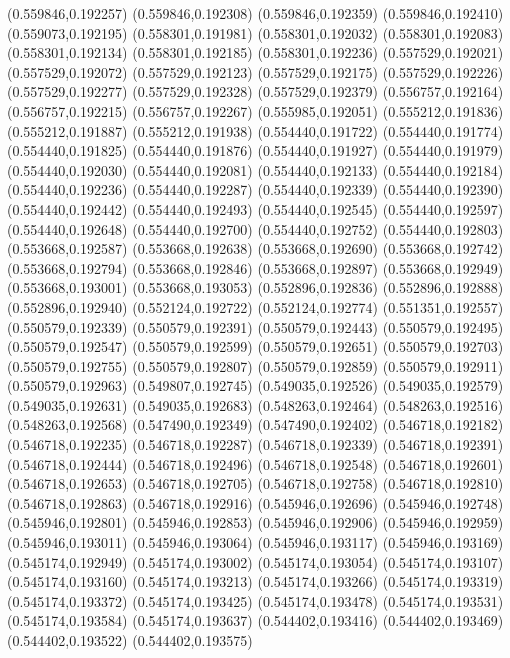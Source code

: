 (0.559846,0.192257)
(0.559846,0.192308)
(0.559846,0.192359)
(0.559846,0.192410)
(0.559073,0.192195)
(0.558301,0.191981)
(0.558301,0.192032)
(0.558301,0.192083)
(0.558301,0.192134)
(0.558301,0.192185)
(0.558301,0.192236)
(0.557529,0.192021)
(0.557529,0.192072)
(0.557529,0.192123)
(0.557529,0.192175)
(0.557529,0.192226)
(0.557529,0.192277)
(0.557529,0.192328)
(0.557529,0.192379)
(0.556757,0.192164)
(0.556757,0.192215)
(0.556757,0.192267)
(0.555985,0.192051)
(0.555212,0.191836)
(0.555212,0.191887)
(0.555212,0.191938)
(0.554440,0.191722)
(0.554440,0.191774)
(0.554440,0.191825)
(0.554440,0.191876)
(0.554440,0.191927)
(0.554440,0.191979)
(0.554440,0.192030)
(0.554440,0.192081)
(0.554440,0.192133)
(0.554440,0.192184)
(0.554440,0.192236)
(0.554440,0.192287)
(0.554440,0.192339)
(0.554440,0.192390)
(0.554440,0.192442)
(0.554440,0.192493)
(0.554440,0.192545)
(0.554440,0.192597)
(0.554440,0.192648)
(0.554440,0.192700)
(0.554440,0.192752)
(0.554440,0.192803)
(0.553668,0.192587)
(0.553668,0.192638)
(0.553668,0.192690)
(0.553668,0.192742)
(0.553668,0.192794)
(0.553668,0.192846)
(0.553668,0.192897)
(0.553668,0.192949)
(0.553668,0.193001)
(0.553668,0.193053)
(0.552896,0.192836)
(0.552896,0.192888)
(0.552896,0.192940)
(0.552124,0.192722)
(0.552124,0.192774)
(0.551351,0.192557)
(0.550579,0.192339)
(0.550579,0.192391)
(0.550579,0.192443)
(0.550579,0.192495)
(0.550579,0.192547)
(0.550579,0.192599)
(0.550579,0.192651)
(0.550579,0.192703)
(0.550579,0.192755)
(0.550579,0.192807)
(0.550579,0.192859)
(0.550579,0.192911)
(0.550579,0.192963)
(0.549807,0.192745)
(0.549035,0.192526)
(0.549035,0.192579)
(0.549035,0.192631)
(0.549035,0.192683)
(0.548263,0.192464)
(0.548263,0.192516)
(0.548263,0.192568)
(0.547490,0.192349)
(0.547490,0.192402)
(0.546718,0.192182)
(0.546718,0.192235)
(0.546718,0.192287)
(0.546718,0.192339)
(0.546718,0.192391)
(0.546718,0.192444)
(0.546718,0.192496)
(0.546718,0.192548)
(0.546718,0.192601)
(0.546718,0.192653)
(0.546718,0.192705)
(0.546718,0.192758)
(0.546718,0.192810)
(0.546718,0.192863)
(0.546718,0.192916)
(0.545946,0.192696)
(0.545946,0.192748)
(0.545946,0.192801)
(0.545946,0.192853)
(0.545946,0.192906)
(0.545946,0.192959)
(0.545946,0.193011)
(0.545946,0.193064)
(0.545946,0.193117)
(0.545946,0.193169)
(0.545174,0.192949)
(0.545174,0.193002)
(0.545174,0.193054)
(0.545174,0.193107)
(0.545174,0.193160)
(0.545174,0.193213)
(0.545174,0.193266)
(0.545174,0.193319)
(0.545174,0.193372)
(0.545174,0.193425)
(0.545174,0.193478)
(0.545174,0.193531)
(0.545174,0.193584)
(0.545174,0.193637)
(0.544402,0.193416)
(0.544402,0.193469)
(0.544402,0.193522)
(0.544402,0.193575)
